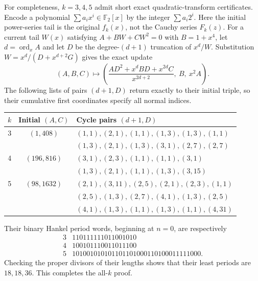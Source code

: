 \documentclass[11pt,a4paper]{article}
\theoremstyle{definition}
\theoremstyle{remark}
\begin{document}
For completeness, $k=3,4,5$ admit short exact quadratic-transform
certificates. Encode a polynomial $\sum a_i x^i\in\mathbb F_2[x]$ by
the integer $\sum a_i2^i$. Here the initial power-series tail is the
original $f_k(x)$, not the Cauchy series $F_k(z)$. For a current tail
$W(x)$ satisfying $A+BW+CW^2=0$ with
$B=1+x^4$, let $d=\operatorname{ord}_x A$ and let $D$ be the
degree-$(d+1)$ truncation of $x^d/W$. Substitution
$W=x^d/(D+x^{d+2}G)$ gives the exact update
\[
 (A,B,C)\longmapsto
 \left(\frac{AD^2+x^dBD+x^{2d}C}{x^{2d+2}},\ B,\ x^2A\right).
\]
The following lists of pairs $(d+1,D)$ return exactly to their initial
triple, so their cumulative first coordinates specify all normal indices.
\begin{center}\small
\begin{tabular}{ccl}
\toprule
$k$ & Initial $(A,C)$ & Cycle pairs $(d+1,D)$\\
\midrule
3 & $(1,408)$ & $(1,1),(2,1),(1,1),(1,3),(1,3),(1,1)$\\
  & & $(1,3),(2,1),(1,3),(3,1),(2,7),(2,7)$\\[2pt]
4 & $(196,816)$ & $(3,1),(2,3),(1,1),(1,1),(3,1)$\\
  & & $(1,3),(2,1),(1,1),(1,3),(3,15)$\\[2pt]
5 & $(98,1632)$ & $(2,1),(3,11),(2,5),(2,1),(2,3),(1,1)$\\
  & & $(2,5),(1,3),(2,7),(4,1),(1,3),(2,5)$\\
  & & $(4,1),(1,3),(1,1),(1,3),(1,1),(4,31)$\\
\bottomrule
\end{tabular}
\end{center}
Their binary Hankel period words, beginning at $n=0$, are respectively
\[
 \begin{array}{c|l}
 3&110111111011001010\\
 4&100101110011011100\\
 5&101001010101101101000110100011111000.
 \end{array}
\]
Checking the proper divisors of their lengths shows that their least
periods are $18,18,36$. This completes the all-$k$ proof.
\end{document}
